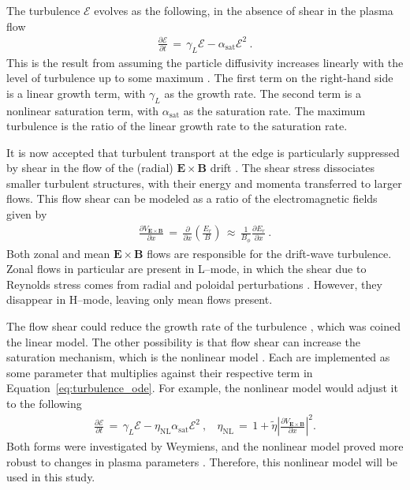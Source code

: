 The turbulence $\mathcal{E}$ evolves as the following, in the absence of shear in the plasma flow
\begin{align} %
	\frac{\partial\mathcal{E}}{\partial t} \,=\, \gamma_L\mathcal{E} - \alpha_\text{sat}\mathcal{E}^2~.
	\label{eq:turbulence_ode}
\end{align}
This is the result from assuming the particle diffusivity increases linearly with the level of turbulence up to some maximum \cite{diamond_dynamics_1995}.
The first term on the right-hand side is a linear growth term, with $\gamma_L$ as the growth rate.
The second term is a nonlinear saturation term, with $\alpha_\text{sat}$ as the saturation rate.
The maximum turbulence is the ratio of the linear growth rate to the saturation rate.

It is now accepted that turbulent transport at the edge is particularly suppressed by shear in the flow of the (radial) $\mathbf{E}\times\mathbf{B}$ drift \cite{terry_suppression_2000}.
The shear stress dissociates smaller turbulent structures, with their energy and momenta transferred to larger flows.
This flow shear can be modeled as a ratio of the electromagnetic fields given by \cite{staps_backstepping_2017}
\begin{align} %
	\frac{\partial V_{\mathbf{E}\times\mathbf{B}}}{\partial x} \,=\, \frac{\partial}{\partial x} \left(\frac{E_r}{B}\right) \,\approx\, \frac{1}{B_\phi} \frac{\partial E_r}{\partial x}~.
	\label{eq:velocity_shear}
\end{align}
Both zonal and mean $\mathbf{E}\times\mathbf{B}$ flows are responsible for the drift-wave turbulence.
Zonal flows in particular are present in L--mode, in which the shear due to Reynolds stress comes from radial and poloidal perturbations \cite{diamond_zonal_2005}.
However, they disappear in H--mode, leaving only mean flows present.

The flow shear could reduce the growth rate of the turbulence \cite{diamond_self-regulating_1994}, which was coined the linear model.
The other possibility is that flow shear can increase the saturation mechanism, which is the nonlinear model \cite{hahm_rotation_1994}.
Each are implemented as some parameter that multiplies against their respective term in Equation~\ref{eq:turbulence_ode}.
For example, the nonlinear model would adjust it to the following
\begin{align} %
	\frac{\partial\mathcal{E}}{\partial t} \,=\, \gamma_L\mathcal{E} - \eta_\text{NL}\alpha_\text{sat}\mathcal{E}^2~, ~~~~
	\eta_\text{NL} \,=\, 1 + \tilde{\eta} \left|\frac{\partial V_{\mathbf{E}\times\mathbf{B}}}{\partial x}\right|^2.
	\label{eq:nonlinear_turbulence_ode}
\end{align}
Both forms were investigated by Weymiens, and the nonlinear model proved more robust to changes in plasma parameters \cite{weymiens_bifurcation_2014}.
Therefore, this nonlinear model will be used in this study.

